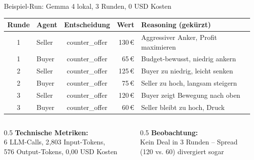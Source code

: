 \documentclass[aspectratio=169, 12pt]{beamer}
\begin{document}
\begin{frame}{Beispiel-Run: Gemma 4 lokal, 3 Runden, 0 USD Kosten}

\begin{table}[h]
\centering\small
\begin{tabular}{clcrl}
\toprule
\textbf{Runde} & \textbf{Agent} & \textbf{Entscheidung} & \textbf{Wert} & \textbf{Reasoning (gek\"urzt)} \\
\midrule
1 & Seller & counter\_offer & 130\,€ & Aggressiver Anker, Profit maximieren \\
1 & Buyer  & counter\_offer &  65\,€ & Budget-bewusst, niedrig ankern \\
\midrule
2 & Seller & counter\_offer & 125\,€ & Buyer zu niedrig, leicht senken \\
2 & Buyer  & counter\_offer &  75\,€ & Seller zu hoch, langsam steigern \\
\midrule
3 & Seller & counter\_offer & 120\,€ & Buyer zeigt Bewegung nach oben \\
3 & Buyer  & counter\_offer &  60\,€ & Seller bleibt zu hoch, Druck \\
\bottomrule
\end{tabular}
\end{table}

\vspace{0.3cm}

\begin{columns}[T]
\begin{column}{0.5\textwidth}
\small
\textbf{Technische Metriken:}\\
6 LLM-Calls, 2{,}803 Input-Tokens,\\
576 Output-Tokens, 0{,}00 USD Kosten
\end{column}
\begin{column}{0.5\textwidth}
\small
\textbf{Beobachtung:}\\
Kein Deal in 3 Runden -- Spread\\
(120 vs. 60) divergiert sogar
\end{column}
\end{columns}

\end{frame}
\end{document}
